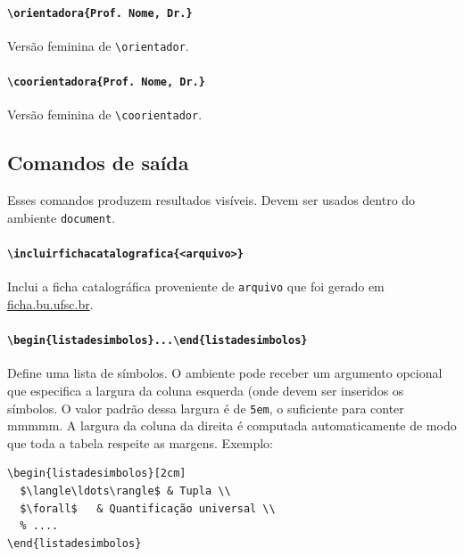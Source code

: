 \documentclass[embeddedlogo]{ufsc-thesis-rn46-2019}
\newcommand{\lacmd}[1]{\texttt{\textbackslash{}#1}}
\newcommand{\laenv}[1]{\texttt{\textbackslash{}begin\{#1\}...\textbackslash{}end\{#1\}}}
\begin{document}
\paragraph*{\lacmd{orientadora\{Prof. Nome, Dr.\}}} Versão feminina de \lacmd{orientador}.

\paragraph*{\lacmd{coorientadora\{Prof. Nome, Dr.\}}} Versão feminina de \lacmd{coorientador}.

\subsection{Comandos de saída}

Esses comandos produzem resultados visíveis. Devem ser usados dentro do
ambiente \texttt{document}.

\paragraph*{\lacmd{incluirfichacatalografica\{<arquivo>\}}}
Inclui a ficha catalográfica proveniente de \texttt{arquivo} que foi gerado em
\href{http://ficha.bu.ufsc.br/}{ficha.bu.ufsc.br}.

\paragraph*{\laenv{listadesimbolos}}
Define uma lista de símbolos. O ambiente pode receber um argumento opcional que
especifica a largura da coluna esquerda (onde devem ser inseridos os símbolos. O
valor padrão dessa largura é de \texttt{5em}, o suficiente para conter mmmmm. A
largura da coluna da direita é computada automaticamente de modo que toda a
tabela respeite as margens. Exemplo:

\begin{verbatim}
\begin{listadesimbolos}[2cm]
  $\langle\ldots\rangle$ & Tupla \\
  $\forall$   & Quantificação universal \\
  % ....
\end{listadesimbolos}
\end{verbatim}
\end{document}
